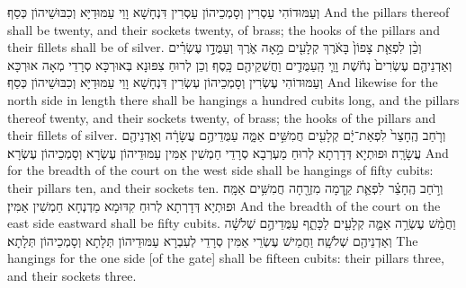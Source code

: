 {{וְעַמּוּדוֹהִי עַסְרִין וְסָמְכֵיהוֹן עַסְרִין דִּנְחָשָׁא וָוֵי עַמּוּדַיָּא וְכִבּוּשֵׁיהוֹן כְּסַף׃}
{And the pillars thereof shall be twenty, and their sockets twenty, of brass; the hooks of the pillars and their fillets shall be of silver.}{}
{וְכֵ֨ן לִפְאַ֤ת צָפוֹן֙ בָּאֹ֔רֶךְ קְלָעִ֖ים מֵ֣אָה אֹ֑רֶךְ וְעַמֻּדָ֣ו עֶשְׂרִ֗ים וְאַדְנֵיהֶ֤ם עֶשְׂרִים֙ נְחֹ֔שֶׁת וָוֵ֧י הָֽעַמֻּדִ֛ים וַחֲשֻׁקֵיהֶ֖ם כָּֽסֶף׃}
{וְכֵן לְרוּחַ צִפּוּנָא בְּאוּרְכָּא סְרָדֵי מְאָה אוּרְכָּא וְעַמּוּדוֹהִי עֶשְׂרִין וְסָמְכֵיהוֹן עְשְׂרִין דִּנְחָשָׁא וָוֵי עַמּוּדַיָּא וְכִבּוּשֵׁיהוֹן כְּסַף׃}
{And likewise for the north side in length there shall be hangings a hundred cubits long, and the pillars thereof twenty, and their sockets twenty, of brass; the hooks of the pillars and their fillets of silver.}{}
{וְרֹ֤חַב הֶֽחָצֵר֙ לִפְאַת־יָ֔ם קְלָעִ֖ים חֲמִשִּׁ֣ים אַמָּ֑ה עַמֻּדֵיהֶ֣ם עֲשָׂרָ֔ה וְאַדְנֵיהֶ֖ם עֲשָׂרָֽה׃}
{וּפוּתְיָא דְּדָרְתָא לְרוּחַ מַעְרְבָא סְרָדֵי חַמְשִׁין אַמִּין עַמּוּדֵיהוֹן עֶשְׂרָא וְסָמְכֵיהוֹן עֶשְׂרָא׃}
{And for the breadth of the court on the west side shall be hangings of fifty cubits: their pillars ten, and their sockets ten.}{}
{וְרֹ֣חַב הֶֽחָצֵ֗ר לִפְאַ֛ת קֵ֥דְמָה מִזְרָ֖חָה חֲמִשִּׁ֥ים אַמָּֽה׃
}
{וּפוּתְיָא דְּדָרְתָא לְרוּחַ קִדּוּמָא מַדְנְחָא חַמְשִׁין אַמִּין׃}
{And the breadth of the court on the east side eastward shall be fifty cubits.}{}
{וַחֲמֵ֨שׁ עֶשְׂרֵ֥ה אַמָּ֛ה קְלָעִ֖ים לַכָּתֵ֑ף עַמֻּדֵיהֶ֣ם שְׁלֹשָׁ֔ה וְאַדְנֵיהֶ֖ם שְׁלֹשָֽׁה׃
}
{וַחֲמֵישׁ עֶשְׂרֵי אַמִּין סְרָדֵי לְעִבְרָא עַמּוּדֵיהוֹן תְּלָתָא וְסָמְכֵיהוֹן תְּלָתָא׃}
{The hangings for the one side [of the gate] shall be fifteen cubits: their pillars three, and their sockets three.}{}
}
